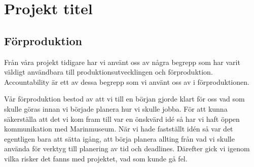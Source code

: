 \documentclass[12pt, titlepage]{article}
\begin{document}
\section{Projekt titel}
\subsection{Förproduktion}
Från våra projekt tidigare har vi använt oss av några begrepp som har varit väldigt 
användbara till produktionsutvecklingen och förproduktion. Accountability är ett av 
dessa begrepp som vi använt oss av i förproduktionen. 

Vår förproduktion bestod av att 
vi till en början gjorde klart för oss vad som skulle göras innan vi började planera hur vi skulle jobba. 
För att kunna säkerställa att det vi kom fram till var en önskvärd idé så har vi haft öppen kommunikation med Marinmuseum. 
När vi hade fastställt idén så var det egentligen bara att sätta igång, 
att börja planera allting från vad vi skulle använda för verktyg till planering av tid och deadlines. 
Därefter gick vi igenom vilka risker det fanns med projektet, vad som kunde gå fel. 
\end{document}
